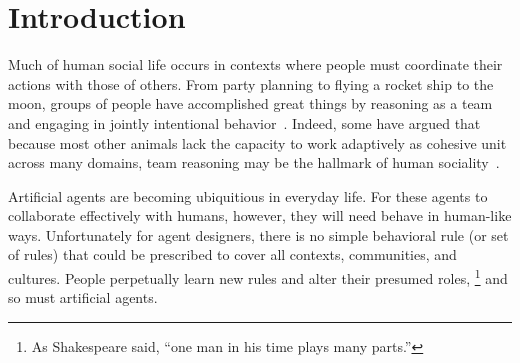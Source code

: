 \section{Introduction}
\label{sec:intro}

Much of human social life occurs in contexts where people must
coordinate their actions with those of others.  From party planning to
flying a rocket ship to the moon, groups of people have accomplished
great things by reasoning as a team and engaging in jointly
intentional behavior~\cite{searle1995construction}.  Indeed, some have
argued that because most other animals lack the capacity to work
adaptively as cohesive unit across many domains, team reasoning may be
the hallmark of human sociality~\cite{tomasello2005understanding}.


Artificial agents are becoming ubiquitious in everyday life.  For
these agents to collaborate effectively with humans, however, they will
need behave in human-like ways.  Unfortunately for agent designers,
there is no simple behavioral rule (or set of rules) that could be
prescribed to cover all contexts, communities, and cultures.  People
perpetually learn new rules and alter their presumed roles,%
\footnote{As Shakespeare said, ``one man in his time plays many parts.''}
and so must artificial agents.





